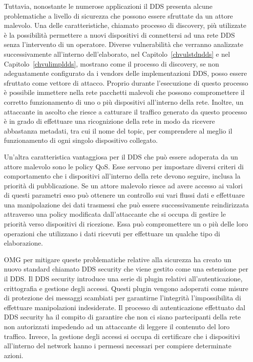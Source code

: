 Tuttavia, nonostante le numerose applicazioni il DDS presenta alcune 
problematiche a livello di sicurezza che possono 
essere sfruttate da un attore malevolo. Una delle 
caratteristiche, chiamato processo di discovery,
più utilizzate è la possibilità permettere 
a nuovi dispositivi di connettersi ad una rete DDS senza 
l'intervento di un operatore. Diverse vulnerabilità che verranno 
analizzate successivamente all'interno dell'elaborato, nel 
Capitolo~\ref{chvulstdndds} e nel Capitolo~\ref{chvulimpldds}, 
mostrano come il processo di discovery, se non adeguatamente 
configurato da i vendors delle implementazioni DDS, posso 
essere sfruttato come vettore di attacco. Proprio durante 
l'esecuzione di questo processo è possibile immettere nella 
rete pacchetti malevoli che possono compromettere il 
corretto funzionamento di uno o più dispositivi all'interno 
della rete. Inoltre, un attaccante in ascolto 
che riesce a catturare 
il traffico generato da questo processo è in grado 
di effettuare una ricognizione della rete in modo da 
ricevere abbastanza metadati, tra cui il nome del topic,
per comprendere al meglio 
il funzionamento di ogni singolo dispositivo collegato.

Un'altra caratteristica vantaggiosa per il DDS che può 
essere adoperata da un attore malevolo sono le policy QoS.
Esse servono per impostare diversi criteri di
comportamento che i dispositivi all'interno della rete 
devono seguire, inclusa la priorità di pubblicazione.
Se un attore malevolo riesce ad avere accesso ai valori 
di questi parametri esso può ottenere un controllo sui 
vari flussi dati e effettuare una manipolazione 
dei dati trasmessi che può essere 
successivamente reindirizzata attraverso una policy modificata 
dall'attaccante che 
si occupa di gestire le 
priorità verso dispositivi di ricezione. Essa può compromettere
un o più delle loro operazioni che utilizzano 
i dati ricevuti per effettuare un qualche tipo di elaborazione.

OMG per mitigare queste problematiche relative alla sicurezza 
ha creato un nuovo standard chiamato DDS security che viene
gestito come una estensione per il DDS. Il DDS security introduce 
una serie di plugin relativi all'autenticazione, crittografia e 
gestione degli accessi. Questi plugin vengono adoperati come misure 
di protezione dei messaggi scambiati per garantirne l'integrità 
l'impossibilita di effettuare manipolazioni indesiderate. 
Il processo di autenticazione effettuato dal DDS security 
ha il compito di garantire che non ci siano partecipanti della 
rete non autorizzati impedendo ad un attaccante di leggere 
il contenuto del loro traffico. Invece, la gestione degli accessi
si occupa di certificare che i dispositivi all'interno del network
hanno i permessi necessari per compiere determinate azioni.

